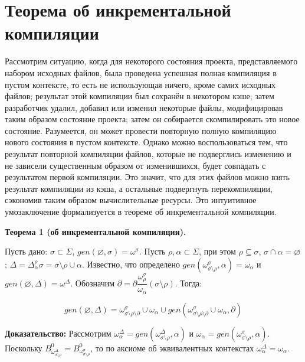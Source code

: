 %
%



\newpage
\section{Теорема об инкрементальной компиляции}

Рассмотрим ситуацию, когда для некоторого состояния проекта, представляемого набором исходных файлов, была проведена успешная полная компиляция в пустом контексте, то есть не использующая ничего, кроме самих исходных файлов; результат этой компиляции был сохранён в некотором кэше; затем разработчик удалил, добавил или изменил некоторые файлы, модифицировав таким образом состояние проекта; затем он собирается скомпилировать это новое состояние. Разумеется, он может провести повторную полную компиляцию нового состояния в пустом контексте. Однако можно воспользоваться тем, что результат повторной компиляции файлов, которые не подверглись изменению и не зависели существенным образом от изменившихся, будет совпадать с результатом первой компиляции. Это значит, что для этих файлов можно взять результат компиляции из кэша, а остальные подвергнуть перекомпиляции, сэкономив таким образом вычислительные ресурсы. Это интуитивное умозаключение формализуется в теореме об инкрементальной компиляции.\\

\newcommand{\butpartial}{\sigma\setminus\rho\setminus\partial}

\textbf{Теорема 1 (об инкрементальной компиляции).}

Пусть дано: $\sigma \subset \Sigma$, $gen(\varnothing, \sigma) = \omega^\sigma$. Пусть $\rho, \alpha \subset \Sigma$, при этом $\rho \subseteq \sigma$, $\sigma \cap \alpha = \varnothing$; $\Delta = \Delta^\rho_\alpha\sigma = \sigma\setminus\rho\cup\alpha$. Известно, что определено $gen(\omega^\sigma_{\sigma\setminus\rho}, \alpha) = \omega_\alpha$ и $gen(\varnothing, \Delta) = \omega^\Delta$. Обозначим $\partial = \partial\dfrac{\omega^\sigma_\rho}{\omega_\alpha}(\sigma\setminus\rho)$.
Тогда:

$$gen(\varnothing, \Delta) = \omega^\sigma_{\butpartial} \cup \omega_\alpha \cup gen(\omega^\sigma_{\butpartial} \cup \omega_\alpha, \partial)$$

\textbf{Доказательство:}
Рассмотрим $\omega^\Delta_\alpha = gen(\omega^\Delta_{\sigma\setminus\rho}, \alpha)$ и $\omega_\alpha = gen(\omega^\sigma_{\sigma\setminus\rho}, \alpha)$. Поскольку $B^0_{\omega^\Delta_{\sigma\setminus\rho}} = B^0_{\omega^\sigma_{\sigma\setminus\rho}}$, то по аксиоме об эквивалентных контекстах $\omega^\Delta_\alpha = \omega_\alpha$.

